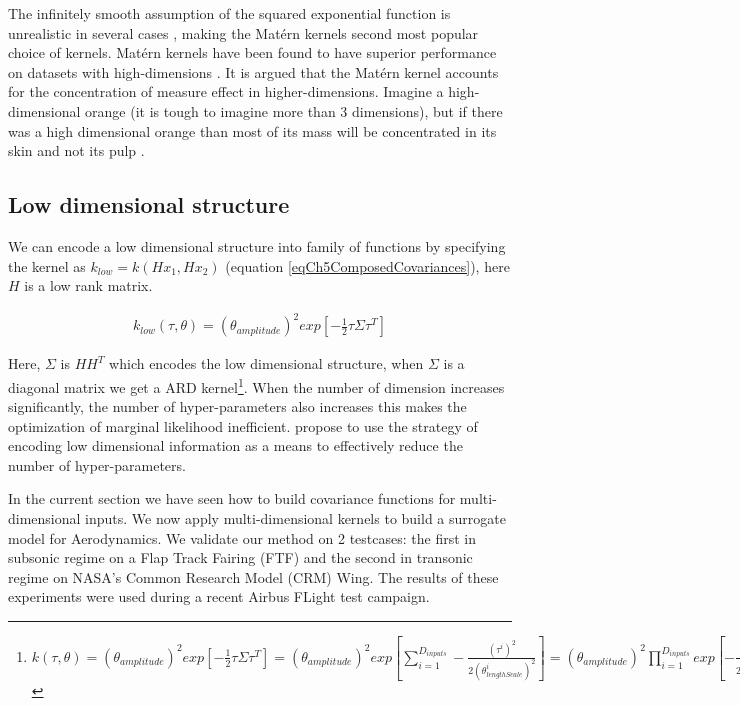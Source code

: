 The infinitely smooth assumption of the squared exponential function is unrealistic in several cases \cite{stein2012interpolation}, making the Mat\'ern kernels second most popular choice of kernels. Mat\'ern kernels have been found to have superior performance on datasets with high-dimensions \cite{le2013fastfood}. It is argued that the Mat\'ern kernel accounts for the concentration of measure effect in higher-dimensions. Imagine a high-dimensional orange (it is tough to imagine more than 3 dimensions), but if there was a high dimensional orange than most of its mass will be concentrated in its skin and not its pulp \cite{domingos2012few}. 

\subsection{Low dimensional structure}\label{subSecLowDimensionalStructure}
We can encode a low dimensional structure into family of functions by specifying the kernel as $k_{low} = k(Hx_{1}, Hx_{2})$ (equation \ref{eqCh5ComposedCovariances}), here $H$ is a low rank matrix. 


\begin{align}\label{eq:SELowDimensional}
k_{low}(\tau, \theta) = (\theta_{amplitude})^2  exp\left [  -\frac{1}{2}\tau\Sigma\tau^T \right ] 
\end{align}

Here, $\Sigma$ is $HH^T$ which encodes the low dimensional structure, when $\Sigma$ is a diagonal matrix we get a ARD kernel\footnote{$k(\tau, \theta) = (\theta_{amplitude})^2  exp\left [  -\frac{1}{2}\tau\Sigma\tau^T \right ] = (\theta_{amplitude})^2  exp\left [ \sum_{i=1}^{D_{inputs}} -\frac{(\tau^{i})^2}{2(\theta_{lengthScale}^{i})^2} \right ] 
= (\theta_{amplitude})^2 \prod_{i=1}^{D_{inputs}}  exp\left [ -\frac{(\tau^{i})^2}{2(\theta_{lengthScale}^{i})^2} \right ]$}. When the number of dimension increases significantly, the number of hyper-parameters also increases this makes the optimization of marginal likelihood inefficient. \cite{bouhlel2016optimisation} propose to use the strategy of encoding low dimensional information as a means to effectively reduce the number of hyper-parameters.

In the current section we have seen how to build covariance functions for multi-dimensional inputs. We now apply multi-dimensional kernels to build a surrogate model for Aerodynamics. We validate our method on 2 testcases: the first in subsonic regime on a Flap Track Fairing (FTF) and the second in transonic regime on NASA's Common Research Model (CRM) Wing. The results of these experiments were used during a recent Airbus FLight test campaign.

